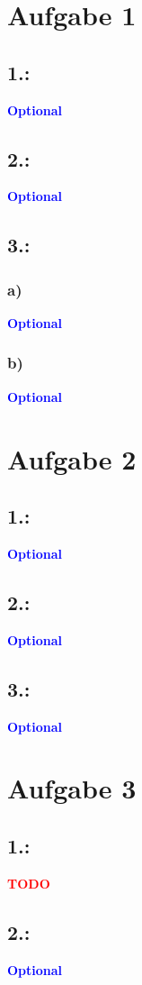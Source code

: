 \documentclass[a4paper,11pt]{scrartcl}
\title{\titleinfo}
\author{\authorinfo}
\newcommand{\todo}{\textcolor{red}{\textbf{TODO}}}
\newcommand{\opt}{\textcolor{blue}{\textbf{Optional}}}
\begin{document}
\maketitle
\section*{Aufgabe 1}
	\subsection*{1.:}
	\opt
	\subsection*{2.:}
	\opt
	\subsection*{3.:}
		\subsubsection*{a)}
		\opt
		\subsubsection*{b)}
		\opt
		
\section*{Aufgabe 2}
	\subsection*{1.:}
	\opt
	\subsection*{2.:}
	\opt
	\subsection*{3.:}
	\opt

\section*{Aufgabe 3}
	\subsection*{1.:}
	\todo
	\subsection*{2.:}
	\opt
\end{document}
